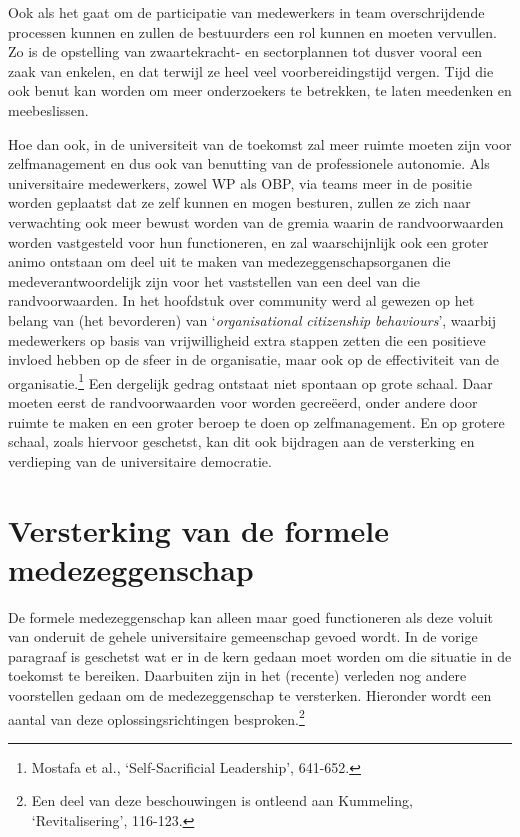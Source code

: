 \documentclass[smallauthor, chapterhaspagenum, nochapterinheader, pagenuminheader,  bigchapnum,medium2, tocpages, garamond, titleinheader]{jote-book}
\begin{document}
	Ook als het gaat om de participatie van medewerkers in team overschrijdende processen kunnen en zullen de bestuurders een rol kunnen en moeten vervullen. Zo is de opstelling van zwaartekracht- en sectorplannen tot dusver vooral een zaak van enkelen, en dat terwijl ze heel veel voorbereidingstijd vergen. Tijd die ook benut kan worden om meer onderzoekers te betrekken, te laten meedenken en meebeslissen.



	Hoe dan ook, in de universiteit van de toekomst zal meer ruimte moeten zijn voor zelfmanagement en dus ook van benutting van de professionele autonomie. Als universitaire medewerkers, zowel WP als OBP, via teams meer in de positie worden geplaatst dat ze zelf kunnen en mogen besturen, zullen ze zich naar verwachting ook meer bewust worden van de gremia waarin de randvoorwaarden worden vastgesteld voor hun functioneren, en zal waarschijnlijk ook een groter animo ontstaan om deel uit te maken van medezeggenschapsorganen die medeverantwoordelijk zijn voor het vaststellen van een deel van die randvoorwaarden. In het hoofdstuk over community werd al gewezen op het belang van (het bevorderen) van ‘\emph{organisational}\emph{ }\emph{citizenship}\emph{ }\emph{behaviours}', waarbij medewerkers op basis van vrijwilligheid extra stappen zetten die een positieve invloed hebben op de sfeer in de organisatie, maar ook op de effectiviteit van de organisatie.\footnote{Mostafa et al., ‘Self-Sacrificial Leadership', 641-652.} Een dergelijk gedrag ontstaat niet spontaan op grote schaal. Daar moeten eerst de randvoorwaarden voor worden gecreëerd, onder andere door ruimte te maken en een groter beroep te doen op zelfmanagement. En op grotere schaal, zoals hiervoor geschetst, kan dit ook bijdragen aan de versterking en verdieping van de universitaire democratie.



	\section{Versterking van de formele medezeggenschap}



	De formele medezeggenschap kan alleen maar goed functioneren als deze voluit van onderuit de gehele universitaire gemeenschap gevoed wordt. In de vorige paragraaf is geschetst wat er in de kern gedaan moet worden om die situatie in de toekomst te bereiken. Daarbuiten zijn in het (recente) verleden nog andere voorstellen gedaan om de medezeggenschap te versterken. Hieronder wordt een aantal van deze oplossingsrichtingen besproken.\footnote{Een deel van deze beschouwingen is ontleend aan Kummeling, ‘Revitalisering', 116-123.}
\end{document}

